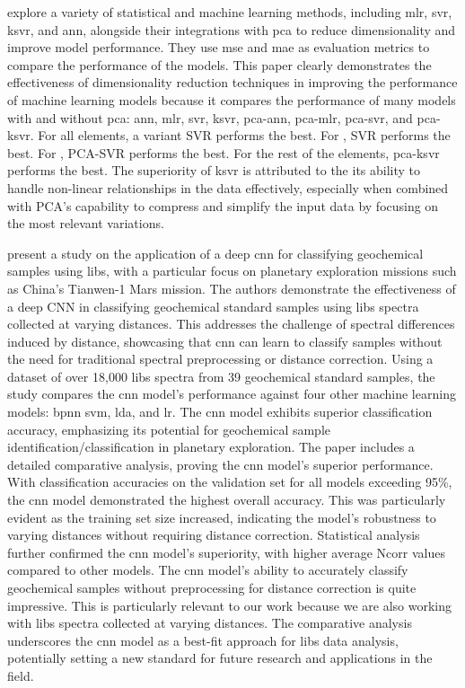 \citet{rezaei_dimensionality_reduction} explore a variety of statistical and machine learning methods, including \gls{mlr}, \gls{svr}, \gls{ksvr}, and \gls{ann}, alongside their integrations with \gls{pca} to reduce dimensionality and improve model performance.
They use \gls{mse} and \gls{mae} as evaluation metrics to compare the performance of the models.
This paper clearly demonstrates the effectiveness of dimensionality reduction techniques in improving the performance of machine learning models because it compares the performance of many models with and without \gls{pca}: \gls{ann}, \gls{mlr}, \gls{svr}, \gls{ksvr}, \gls{pca}-\gls{ann}, \gls{pca}-\gls{mlr}, \gls{pca}-\gls{svr}, and \gls{pca}-\gls{ksvr}.
For all elements, a variant SVR performs the best.
For , SVR performs the best.
For , PCA-SVR performs the best.
For the rest of the elements, \gls{pca}-\gls{ksvr} performs the best.
The superiority of \gls{ksvr} is attributed to the its ability to handle non-linear relationships in the data effectively, especially when combined with PCA's capability to compress and simplify the input data by focusing on the most relevant variations.

\citet{yang_laser-induced_2022} present a study on the application of a deep \gls{cnn} for classifying geochemical samples using \gls{libs}, with a particular focus on planetary exploration missions such as China's Tianwen-1 Mars mission.
The authors demonstrate the effectiveness of a deep CNN in classifying geochemical standard samples using \gls{libs} spectra collected at varying distances.
This addresses the challenge of spectral differences induced by distance, showcasing that \gls{cnn} can learn to classify samples without the need for traditional spectral preprocessing or distance correction.
Using a dataset of over 18,000 \gls{libs} spectra from 39 geochemical standard samples, the study compares the \gls{cnn} model's performance against four other machine learning models: \gls{bpnn} \gls{svm}, \gls{lda}, and \gls{lr}.
The \gls{cnn} model exhibits superior classification accuracy, emphasizing its potential for geochemical sample identification/classification in planetary exploration.
The paper includes a detailed comparative analysis, proving the \gls{cnn} model's superior performance.
With classification accuracies on the validation set for all models exceeding 95\%, the \gls{cnn} model demonstrated the highest overall accuracy.
This was particularly evident as the training set size increased, indicating the model's robustness to varying distances without requiring distance correction.
Statistical analysis further confirmed the \gls{cnn} model's superiority, with higher average Ncorr values compared to other models.
The \gls{cnn} model's ability to accurately classify geochemical samples without preprocessing for distance correction is quite impressive.
This is particularly relevant to our work because we are also working with \gls{libs} spectra collected at varying distances.
The comparative analysis underscores the \gls{cnn} model as a best-fit approach for \gls{libs} data analysis, potentially setting a new standard for future research and applications in the field.

